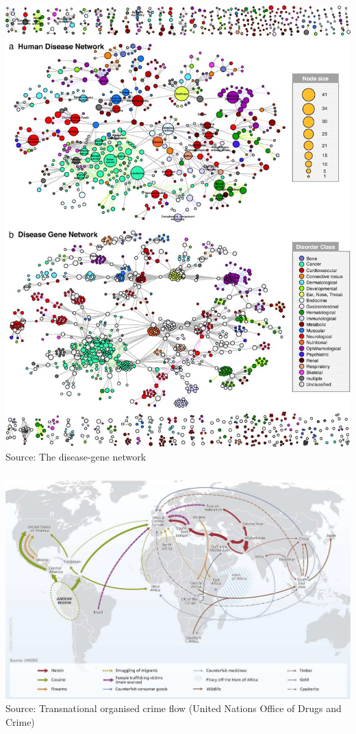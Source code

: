 \documentclass[8pt]{beamer}
\begin{document}
\begin{frame}
\frametitle{\insertsection}
\centering
\includegraphics[width=\linewidth,height=0.8\textheight,keepaspectratio]{disease_net}\\
\tiny Source: The disease-gene network \cite{Goh2007}
\end{frame}

 
\begin{frame}
\frametitle{\insertsection}
\centering
\includegraphics[width=\linewidth,height=0.9\textheight,keepaspectratio]{crime}\\
\tiny Source: Transnational organised crime flow (United Nations Office of Drugs and Crime)
\end{frame}
\end{document}

